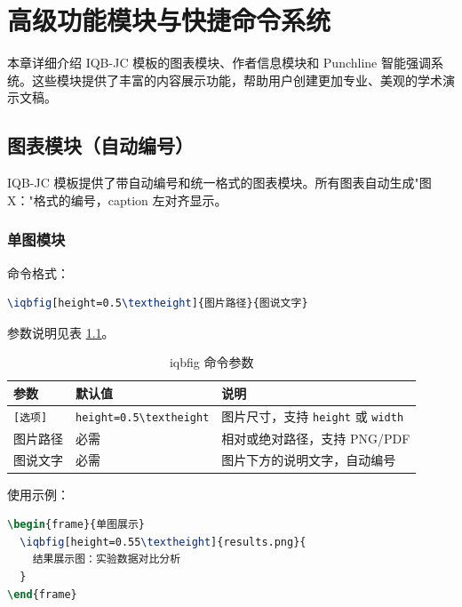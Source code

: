 
\chapter{高级功能模块与快捷命令系统}
\label{chap:7}

本章详细介绍 IQB-JC 模板的图表模块、作者信息模块和 Punchline 智能强调系统。这些模块提供了丰富的内容展示功能，帮助用户创建更加专业、美观的学术演示文稿。

\section{图表模块（自动编号）}

IQB-JC 模板提供了带自动编号和统一格式的图表模块。所有图表自动生成"图X："格式的编号，caption 左对齐显示。

\subsection{单图模块}

命令格式：

\begin{lstlisting}[style=blockstyle,language=TeX]
\iqbfig[height=0.5\textheight]{图片路径}{图说文字}
\end{lstlisting}

参数说明见表 \ref{tab:iqbfig-params}。

\begin{table}[!h]
\centering
\caption{iqbfig 命令参数}
\label{tab:iqbfig-params}
\begin{tabular}{p{2.5cm}p{2.5cm}p{8cm}}
\toprule
\textbf{参数} & \textbf{默认值} & \textbf{说明} \\
\midrule
\lstinline|[选项]| & \lstinline|height=0.5\textheight| & 图片尺寸，支持 \lstinline|height| 或 \lstinline|width| \\
图片路径 & 必需 & 相对或绝对路径，支持 PNG/PDF \\
图说文字 & 必需 & 图片下方的说明文字，自动编号 \\
\bottomrule
\end{tabular}
\end{table}

使用示例：

\begin{lstlisting}[style=blockstyle,language=TeX]
\begin{frame}{单图展示}
  \iqbfig[height=0.55\textheight]{results.png}{
    结果展示图：实验数据对比分析
  }
\end{frame}
\end{lstlisting}

